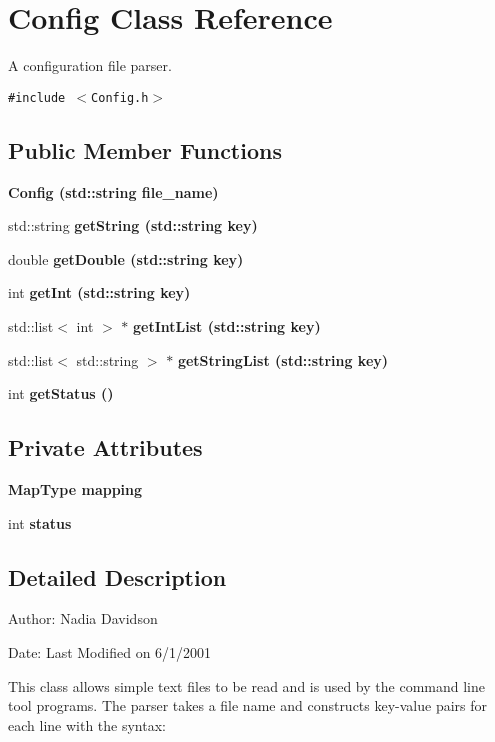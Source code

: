 \section{Config Class Reference}
\label{classConfig}
A configuration file parser.  


{\tt \#include $<$Config.h$>$}

\subsection*{Public Member Functions}
\begin{CompactItemize}
\item 
\bf{Config} (std::string file\_\-name)
\item 
std::string \bf{get\-String} (std::string key)
\item 
double \bf{get\-Double} (std::string key)
\item 
int \bf{get\-Int} (std::string key)
\item 
std::list$<$ int $>$ $\ast$ \bf{get\-Int\-List} (std::string key)
\item 
std::list$<$ std::string $>$ $\ast$ \bf{get\-String\-List} (std::string key)
\item 
int \bf{get\-Status} ()
\end{CompactItemize}
\subsection*{Private Attributes}
\begin{CompactItemize}
\item 
\bf{Map\-Type} \bf{mapping}
\item 
int \bf{status}
\end{CompactItemize}


\subsection{Detailed Description}
\begin{Desc}
\item[Author:]Nadia Davidson \end{Desc}
\begin{Desc}
\item[Date:]Last Modified on 6/1/2001\end{Desc}
This class allows simple text files to be read and is used by the command line tool programs. The parser takes a file name and constructs key-value pairs for each line with the syntax:

